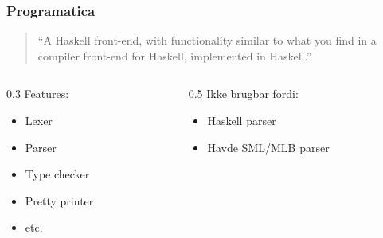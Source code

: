 \documentclass[slidestop,compress,mathserif, xcolor=dvipsnames]{beamer}
\begin{document}
\begin{frame}[c]
  \frametitle{Programatica}  

  \begin{quote}
    "`A Haskell front-end, with functionality similar to what you find in a
    compiler front-end for Haskell, implemented in Haskell."'
    \\ \raggedleft \cite{programatica-features}
  \end{quote}

  \begin{columns}    
    \begin{column}{0.3\textwidth{}}
      Features:
      \begin{itemize}
      \item Lexer
      \item Parser
      \item Type checker
      \item Pretty printer
      \item etc.
      \end{itemize}
    \end{column}
    \begin{column}{0.5\textwidth{}}
      Ikke brugbar fordi:
      \begin{itemize}
      \item Haskell parser
      \item Havde SML/MLB parser 
      \end{itemize}
    \end{column}
  \end{columns}
\end{frame}
\end{document}
